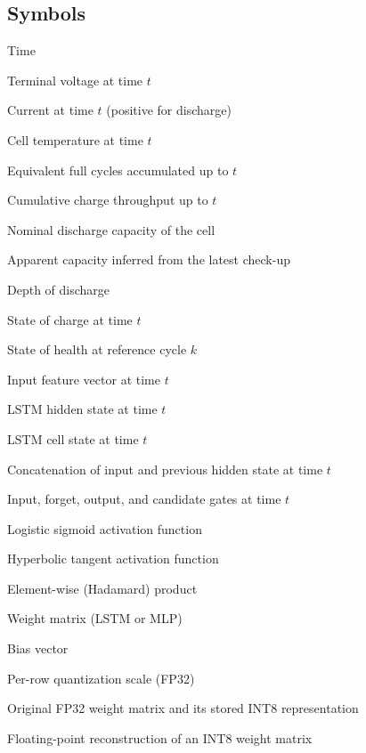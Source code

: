 \documentclass[review]{elsarticle}
\begin{document}
\subsection*{Symbols}
\begin{description}[style=multiline,leftmargin=1.5cm,font=\bfseries]
\item[$t$] Time
\item[$U(t)$] Terminal voltage at time $t$
\item[$I(t)$] Current at time $t$ (positive for discharge)
\item[$T(t)$] Cell temperature at time $t$
\item[$\mathrm{EFC}(t)$] Equivalent full cycles accumulated up to $t$
\item[$Q_c(t)$] Cumulative charge throughput up to $t$
\item[$C_{\mathrm{nom}}$] Nominal discharge capacity of the cell
\item[$C_{\mathrm{app}}$] Apparent capacity inferred from the latest check-up
\item[$\mathrm{DoD}$] Depth of discharge
\item[$\mathrm{SOC}(t)$] State of charge at time $t$
\item[$\mathrm{SOH}_k$] State of health at reference cycle $k$
\item[$\mathbf{x}_t$] Input feature vector at time $t$
\item[$\mathbf{h}_t$] LSTM hidden state at time $t$
\item[$\mathbf{c}_t$] LSTM cell state at time $t$
\item[$\mathbf{z}_t$] Concatenation of input and previous hidden state at time $t$
\item[$\mathbf{i}_t,\mathbf{f}_t,\mathbf{o}_t,\mathbf{g}_t$] Input, forget, output, and candidate gates at time $t$
\item[$\sigma(\cdot)$] Logistic sigmoid activation function
\item[$\tanh(\cdot)$] Hyperbolic tangent activation function
\item[$\odot$] Element-wise (Hadamard) product
\item[$W$] Weight matrix (LSTM or MLP)
\item[$b$] Bias vector
\item[$s$] Per-row quantization scale (FP32)
\item[$W^{\mathrm{fp32}},W^{\mathrm{int8}}$] Original FP32 weight matrix and its stored INT8 representation
\item[$\hat{W}$] Floating-point reconstruction of an INT8 weight matrix

\end{description}
\end{document}
